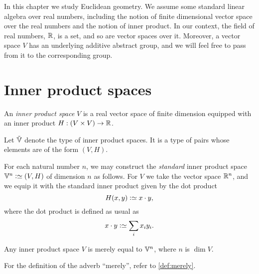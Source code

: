 


In this chapter we study Euclidean geometry.  We assume some standard linear
algebra over real numbers, including the notion of finite dimensional vector
space over the real numbers and the notion of inner product.  In our context,
the field of real numbers, $\mathbb{R}$, is a set, and so are vector spaces over it.
Moreover, a vector space $V$ has an underlying additive abstract group, and we
will feel free to pass from it to the corresponding group.

\section{Inner product spaces}

\begin{definition}\label{def:InnerProductSpace}
  An {\em inner product space} $V$ is a real vector space of finite dimension
  equipped with an inner product $H : (V \times V) \to \mathbb{R} $.
\end{definition}

Let ${\tilde {\mathbb V}}$ denote the type of inner product spaces.  It is a type of pairs whose
elements are of the form $(V,H)$.

For each natural number $n$, we may construct the {\em standard} inner product
space $\VV^n \defeq (V,H)$ of dimension $n$ as follows.  For $V$ we take the
vector space $\mathbb{R}^n$, and we equip it with the standard inner product given by
the dot product
$$ H ( x , y) \defeq x \cdot y, $$
where the dot product is defined as usual as
$$ x \cdot y \defeq \sum_i x_i y_i . $$

\begin{theorem}\label{thm:GramSchmidt}
  Any inner product space $V$ is merely equal to $\mathbb V^n$, where $n$ is $\dim V$.
\end{theorem}

For the definition of the adverb ``merely'', refer to \cref{def:merely}.


